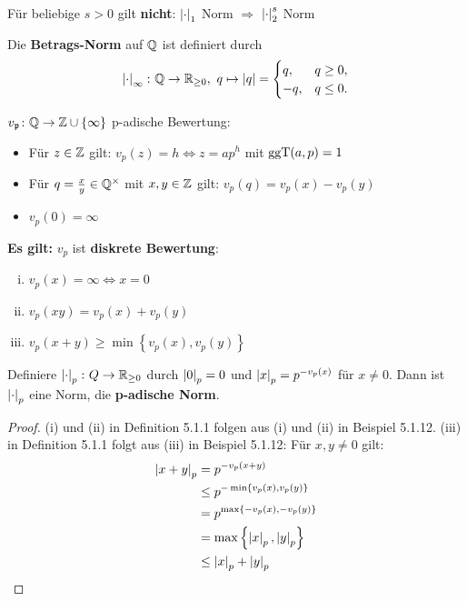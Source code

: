 \begin{Bem}
Für beliebige $s>0$ gilt \textbf{nicht}: $\left|{\cdot}\right|_1$ Norm $\Rightarrow$ $\left|{\cdot}\right|_2^s$ Norm 
\end{Bem}

\begin{Bsp}
Die \textbf{Betrags-Norm} auf $\mathbb{Q}$ ist definiert durch
\[ \abs{\cdot}_\infty \colon \Q \to \R_{\geq 0}, \ q\mapsto \abs{q} = \begin{cases}
q, &\mbox{} q \geq 0, \\
-q, &\mbox{} q \leq 0.
\end{cases}
\]
\end{Bsp}

\begin{recall*}
$v_{\mathfrak{p}} \colon \mathbb{Q} \to \mathbb{Z} \cup \{\infty \}$ p-adische Bewertung:
\begin{itemize}
\item Für $z \in \mathbb{Z}$ gilt: $v_p(z) = h \Leftrightarrow z =ap^h$ mit $\operatorname{ggT}(a,p)=1$
\item Für $q = \frac{x}{y} \in \mathbb{Q}^\times$ mit $x,y \in \mathbb{Z}$ gilt: $v_p(q) = v_p(x)-v_p(y)$
\item $v_p(0) = \infty$
\end{itemize}

\textbf{Es gilt:} $v_p$ ist \textbf{diskrete Bewertung}:
\begin{enumerate}[(i)]
\item $v_p(x) = \infty\Leftrightarrow x = 0$
\item $v_p(xy) = v_p(x) + v_p(y)$
\item $v_p(x+y) \geq \min \left\{ v_p(x), v_p(y) \right\}$
\end{enumerate}
\end{recall*}

\begin{Bem}
Definiere $\left|{\cdot}\right|_p \colon Q \to \mathbb{R}_{\geq 0}$ durch $\left|{0}\right|_p = 0$ und 
$\left|{x}\right|_p = p^{-v_p(x)}$ für $x \neq 0$. Dann ist $\left|{\cdot}\right|_p$ eine Norm, die \textbf{p-adische Norm}.
\end{Bem}


\begin{proof}
(i) und (ii) in Definition 5.1.1 folgen aus (i) und (ii) in Beispiel 5.1.12.
(iii) in Definition 5.1.1 folgt aus (iii) in Beispiel 5.1.12: Für $x,y \neq 0$ gilt:
\begin{align*}
\left|{x+y}\right|_p
&= p^{-v_p(x+y)} \\
&\leq p^{- \min \left\{ v_p(x), v_p(y) \right\}} \\
&= p^{\max \left\{ -v_p(x), -v_p(y) \right\}} \\
&=\max\left\{ \left|{x}\right|_p, \left|{y}\right|_p \right\} \\
&\leq \left|{x}\right|_p + \left|{y}\right|_p \\
\end{align*}
\end{proof}

